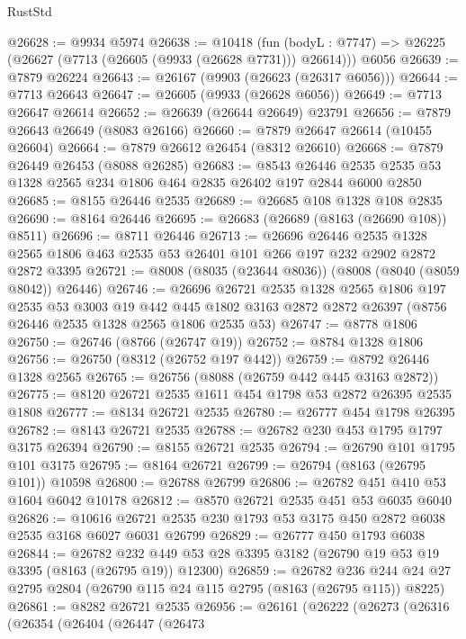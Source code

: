\begin{lexlean}{RustStd}
\begin{coremodule}
@26628 := @9934 @5974
@26638 := @10418
    (fun (bodyL : @7747) => @26225 (@26627 (@7713 (@26605 (@9933 (@26628 @7731))) @26614)))
    @6056
@26639 := @7879 @26224
@26643 := @26167 (@9903 (@26623 (@26317 @6056)))
@26644 := @7713 @26643
@26647 := @26605 (@9933 (@26628 @6056))
@26649 := @7713 @26647 @26614
@26652 := @26639 (@26644 @26649) @23791
@26656 := @7879 @26643 @26649 (@8083 @26166)
@26660 := @7879 @26647 @26614 (@10455 @26604)
@26664 := @7879 @26612 @26454 (@8312 @26610)
@26668 := @7879 @26449 @26453 (@8088 @26285)
@26683 := @8543
    @26446
    @2535
    @2535
    @53
    @1328
    @2565
    @234
    @1806
    @464
    @2835
    @26402
    @197
    @2844
    @6000
    @2850
@26685 := @8155 @26446 @2535
@26689 := @26685 @108 @1328 @108 @2835
@26690 := @8164 @26446
@26695 := @26683 (@26689 (@8163 (@26690 @108)) @8511)
@26696 := @8711 @26446
@26713 := @26696
    @26446
    @2535
    @1328
    @2565
    @1806
    @463
    @2535
    @53
    @26401
    @101
    @266
    @197
    @232
    @2902
    @2872
    @2872
    @3395
@26721 := @8008 (@8035 (@23644 @8036)) (@8008 (@8040 (@8059 @8042)) @26446)
@26746 := @26696
    @26721
    @2535
    @1328
    @2565
    @1806
    @197
    @2535
    @53
    @3003
    @19
    @442
    @445
    @1802
    @3163
    @2872
    @2872
    @26397
    (@8756 @26446 @2535 @1328 @2565 @1806 @2535 @53)
@26747 := @8778 @1806
@26750 := @26746 (@8766 (@26747 @19))
@26752 := @8784 @1328 @1806
@26756 := @26750 (@8312 (@26752 @197 @442))
@26759 := @8792 @26446 @1328 @2565
@26765 := @26756 (@8088 (@26759 @442 @445 @3163 @2872))
@26775 := @8120 @26721 @2535 @1611 @454 @1798 @53 @2872 @26395 @2535 @1808
@26777 := @8134 @26721 @2535
@26780 := @26777 @454 @1798 @26395
@26782 := @8143 @26721 @2535
@26788 := @26782 @230 @453 @1795 @1797 @3175 @26394
@26790 := @8155 @26721 @2535
@26794 := @26790 @101 @1795 @101 @3175
@26795 := @8164 @26721
@26799 := @26794 (@8163 (@26795 @101)) @10598
@26800 := @26788 @26799
@26806 := @26782 @451 @410 @53 @1604 @6042 @10178
@26812 := @8570 @26721 @2535 @451 @53 @6035 @6040
@26826 := @10616 @26721 @2535 @230 @1793 @53 @3175 @450 @2872 @6038 @2535 @3168 @6027 @6031 @26799
@26829 := @26777 @450 @1793 @6038
@26844 := @26782
    @232
    @449
    @53
    @28
    @3395
    @3182
    (@26790 @19 @53 @19 @3395 (@8163 (@26795 @19)) @12300)
@26859 := @26782
    @236
    @244
    @24
    @27
    @2795
    @2804
    (@26790 @115 @24 @115 @2795 (@8163 (@26795 @115)) @8225)
@26861 := @8282 @26721 @2535
@26956 := @26161
    (@26222
      (@26273
        (@26316
          (@26354
            (@26404
              (@26447
                (@26473

\end{coremodule}
\end{lexlean}
